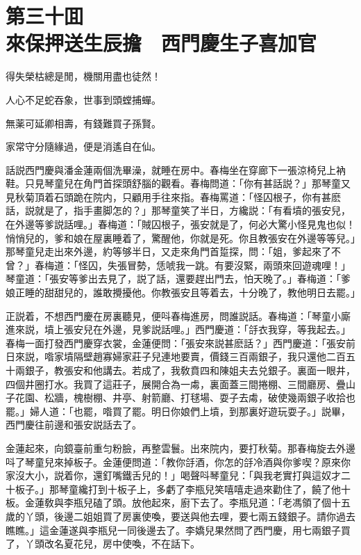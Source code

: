 
\chapter*{第三十囬　\\來保押送生辰擔　西門慶生子喜加官}


\begin{myquote}
得失榮枯總是閒，機關用盡也徒然！

人心不足蛇吞象，世事到頭螳捕蟬。

無薬可延卿相壽，有錢難買子孫賢。

家常守分隨緣過，便是消遙自在仙。
\end{myquote}

話説西門慶與潘金蓮兩個洗畢澡，就睡在房中。春梅坐在穿廊下一張涼椅兒上衲鞋。只見琴童兒在角門首探頭舒腦的觀看。春梅問道：「你有甚話説？」那琴童又見秋菊頂着石頭跪在院内，只顧用手往來指。春梅罵道：「怪囚根子，你有甚麽話，説就是了，指手畫脚怎的？」那琴童笑了半日，方纔説：「有看墳的張安兒，在外邊等爹説話哩。」春梅道：「賊囚根子，張安就是了，何必大驚小怪見鬼也似！悄悄兒的，爹和娘在屋裏睡着了，驚醒他，你就是死。你且教張安在外邊等等兒。」那琴童兒走出來外邊，約等够半日，又走來角門首踅探，問：「姐，爹起來了不曾？」春梅道：「怪囚，失張冒勢，恁唬我一跳。有要沒緊，兩頭來回遊魂哩！」琴童道：「張安等爹出去見了，説了話，還要趕出門去，怕天晚了。」春梅道：「爹娘正睡的甜甜兒的，誰敢攪擾他。你教張安且等着去，十分晚了，教他明日去罷。」

正説着，不想西門慶在房裏聽見，便呌春梅進房，問誰説話。春梅道：「琴童小廝進來説，墳上張安兒在外邊，見爹説話哩。」西門慶道：「㧱衣我穿，等我起去。」春梅一面打發西門慶穿衣裳，金蓮便問：「張安來説甚麽話？」西門慶道：「張安前日來説，喒家墳隔壁趙寡婦家莊子兒連地要賣，價錢三百兩銀子，我只還他二百五十兩銀子，教張安和他講去。若成了，我敎賁四和陳姐夫去兑銀子。裏面一眼井，四個井圈打水。我買了這莊子，展開合為一䖏，裏面蓋三間捲棚、三間廳房、疊山子花園、松牆，槐樹棚、井亭、射箭廳、打毬場、耍子去䖏，破使幾兩銀子收拾也罷。」婦人道：「也罷，喒買了罷。明日你娘們上墳，到那裏好遊玩耍子。」説畢，西門慶往前邊和張安説話去了。

金蓮起來，向鏡臺前重匀粉臉，再整雲鬟。出來院内，要打秋菊。那春梅旋去外邊呌了琴童兒來掉板子。金蓮便問道：「教你㧱酒，你怎的㧱冷酒與你爹喫？原來你家沒大小，説着你，還釘嘴鐵舌兒的！」喝聲呌琴童兒：「與我老實打與這奴才二十板子。」那琴童纔打到十板子上，多虧了李瓶兒笑嘻嘻走過來勸住了，饒了他十板。金蓮敎與李瓶兒磕了頭。放他起來，廚下去了。李瓶兒道：「老馮領了個十五歲的丫頭，後邊二姐姐買了房裏使喚，要送與他去哩，要七兩五錢銀子。請你過去瞧瞧。」這金蓮遂與李瓶兒一同後邊去了。李嬌兒果然問了西門慶，用七兩銀子買了，丫頭改名夏花兒，房中使喚，不在話下。

